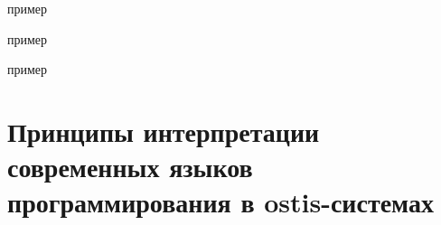 \begin{SCn}
\begin{scnindent}
\begin{scneqtoset}
\begin{scnindent}
\begin{scnhaselementrolelist}{пример}
            \end{scnhaselementrolelist}
        \end{scnindent}
        \begin{scnindent}
            \begin{scnhaselementrolelist}{пример}
            \end{scnhaselementrolelist}
        \end{scnindent}
        \begin{scnindent}
            \begin{scnhaselementrolelist}{пример}
            \end{scnhaselementrolelist}
        \end{scnindent}
    \end{scneqtoset}
\end{scnindent}
\end{SCn}

\begin{SCn}
\end{SCn}

\begin{SCn}
\end{SCn}

\section{Принципы интерпретации современных языков программирования в ostis-системах}

%
